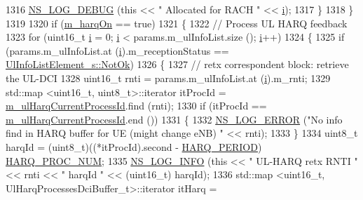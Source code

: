 \begin{DoxyCode}
1316           \hyperlink{group__logging_ga413f1886406d49f59a6a0a89b77b4d0a}{NS\_LOG\_DEBUG} (\textcolor{keyword}{this} << \textcolor{stringliteral}{" Allocated for RACH "} << \hyperlink{bernuolliDistribution_8m_a6f6ccfcf58b31cb6412107d9d5281426}{i});
1317         \}
1318     \}
1319 
1320   \textcolor{keywordflow}{if} (\hyperlink{classns3_1_1RrFfMacScheduler_aa57694b4b80d2dc907f1e5281d3defab}{m\_harqOn} == \textcolor{keyword}{true})
1321     \{
1322       \textcolor{comment}{//   Process UL HARQ feedback}
1323       \textcolor{keywordflow}{for} (uint16\_t \hyperlink{bernuolliDistribution_8m_a6f6ccfcf58b31cb6412107d9d5281426}{i} = 0; \hyperlink{bernuolliDistribution_8m_a6f6ccfcf58b31cb6412107d9d5281426}{i} < params.m\_ulInfoList.size (); \hyperlink{bernuolliDistribution_8m_a6f6ccfcf58b31cb6412107d9d5281426}{i}++)
1324         \{
1325           \textcolor{keywordflow}{if} (params.m\_ulInfoList.at (\hyperlink{bernuolliDistribution_8m_a6f6ccfcf58b31cb6412107d9d5281426}{i}).m\_receptionStatus == 
      \hyperlink{structns3_1_1UlInfoListElement__s_a2a4dff5145d25c81086660e991db6f61a98aed738fd24811d3461668e394a53c8}{UlInfoListElement\_s::NotOk})
1326             \{
1327               \textcolor{comment}{// retx correspondent block: retrieve the UL-DCI}
1328               uint16\_t rnti = params.m\_ulInfoList.at (\hyperlink{bernuolliDistribution_8m_a6f6ccfcf58b31cb6412107d9d5281426}{i}).m\_rnti;
1329               std::map <uint16\_t, uint8\_t>::iterator itProcId = 
      \hyperlink{classns3_1_1RrFfMacScheduler_ad7674f8cb560202bc36a792f7b2755ca}{m\_ulHarqCurrentProcessId}.find (rnti);
1330               \textcolor{keywordflow}{if} (itProcId == \hyperlink{classns3_1_1RrFfMacScheduler_ad7674f8cb560202bc36a792f7b2755ca}{m\_ulHarqCurrentProcessId}.end ())
1331                 \{
1332                   \hyperlink{group__logging_ga0261a8db1d4ac5f79417d117634fd455}{NS\_LOG\_ERROR} (\textcolor{stringliteral}{"No info find in HARQ buffer for UE (might change eNB) "} << 
      rnti);
1333                 \}
1334               uint8\_t harqId = (uint8\_t)((*itProcId).second - \hyperlink{lte-common_8h_a275321ee206f130c3ddc81fcdaa13cfd}{HARQ\_PERIOD}) %
      \hyperlink{cqa-ff-mac-scheduler_8h_a9185d8d7d2b2979181d4a7044a3d3555}{HARQ\_PROC\_NUM};
1335               \hyperlink{group__logging_gafbd73ee2cf9f26b319f49086d8e860fb}{NS\_LOG\_INFO} (\textcolor{keyword}{this} << \textcolor{stringliteral}{" UL-HARQ retx RNTI "} << rnti << \textcolor{stringliteral}{" harqId "} << (uint16\_t)
      harqId);
1336               std::map <uint16\_t, UlHarqProcessesDciBuffer\_t>::iterator itHarq = 

\end{DoxyCode}
